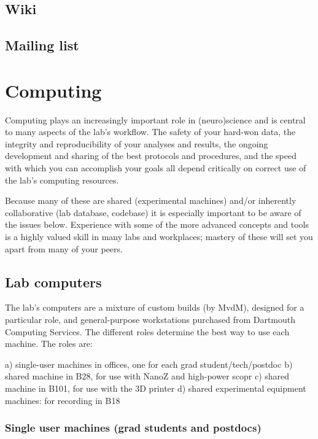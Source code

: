 \documentclass{tufte-book}
\begin{document}
\section{Wiki}

\section{Mailing list}

\chapter{Computing}

Computing plays an increasingly important role in (neuro)science and
is central to many aspects of the lab's workflow. The safety of your
hard-won data, the integrity and reproducibility of your analyses and
results, the ongoing development and sharing of the best protocols and
procedures, and the speed with which you can accomplish your goals all
depend critically on correct use of the lab's computing resources.

Because many of these are shared (experimental machines) and/or
inherently collaborative (lab database, codebase) it is especially
important to be aware of the issues below. Experience with some of the
more advanced concepts and tools is a highly valued skill in many labs
and workplaces; mastery of these will set you apart from many of your
peers.

\section{Lab computers}

The lab's computers are a mixture of custom builds (by MvdM), designed
for a particular role, and general-purpose workstations purchased from
Dartmouth Computing Services. The different roles determine the best
way to use each machine. The roles are:

a) single-user machines in offices, one for each grad student/tech/postdoc
b) shared machine in B28, for use with NanoZ and high-power scopr
c) shared machine in B101, for use with the 3D printer
d) shared experimental equipment machines: for recording in B18

\subsection{Single user machines (grad students and postdocs)}
\end{document}
